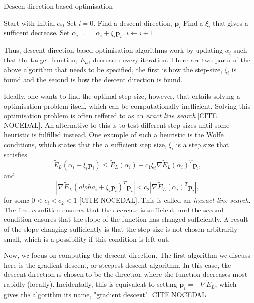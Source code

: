 \documentclass[11pt,a4paper]{article}
\numberwithin{equation}{section}
\begin{document}
\begin{algorithm}
	\caption{Descen-direction based optimisation}
	\label{Alg:descentOptimisation}
	\begin{algorithmic}[1]
        \State Start with initial $\alpha_0$
        \State Set $i = 0$.
        \State Find a descent direction, $\bm{p}_i$
        \State Find a $\xi_i$ that gives a sufficent decrease.
        \State Set $\alpha_{i+1} = \alpha_i + \xi_i \bm{p}_i$.
        \State $i \gets i + 1$
        \EndWhile
		\EndProcedure
	\end{algorithmic}
\end{algorithm}

Thus, descent-direction based optimisation algorithms work by updating $\alpha_i$ such that the target-function, $\tilde{E}_L$, decreases every iteration. There are two parts of the above algorithm that needs to be specified, the first is how the step-size, $\xi_i$ is found and the second is how the descent direction is found. 

Ideally, one wants to find the optimal step-size, however, that entails solving a optimisation problem itself, which can be computationally inefficient. Solving this optimisation problem is often reffered to as an \emph{exact line search} [CITE NOCEDAL]. An alternative to this is to test different step-sizes until some heuristic is fulfilled instead. One example of such a heuristic is the Wolfe conditions, which states that the a sufficient step size, $\xi_i$ is a step size that satisfies
\begin{equation}
    \tilde{E}_L(\alpha_i + \xi_i \bm{p}_i) \leq \tilde{E}_L(\alpha_i) + c_1\xi_i \nabla \tilde{E}_L(\alpha_i)^T\bm{p}_i,
\end{equation}
and
\begin{equation}
    |\nabla \tilde{E}_L(alpha_i + \xi_i \bm{p}_i)^T\bm{p}_i| < c_2 |\nabla \tilde{E}_L(\alpha_i)^T \bm{p}_i |,
\end{equation}
for some $0 < c_i < c_2 < 1$ [CITE NOCEDAL]. This is called an \emph{inexact line search}. The first condition ensures that the decrease is sufficient, and the second condition ensures that the slope of the function has changed sufficiently. A result of the slope changing sufficiently is that the step-size is not chosen arbitrarily small, which is a possibility if this condition is left out.

Now, we focus on computing the descent direction. The first algorithm we discuss here is the gradient descent, or steepest descent algorithm. In this case, the descent-direction is chosen to be the direction where the function decreases most rapidly (locally). Incidentally, this is equivalent to setting $\bm{p}_i = -\nabla \tilde{E}_L$, which gives the algorithm its name, "gradient descent" [CITE NOCEDAL].
\end{document}
